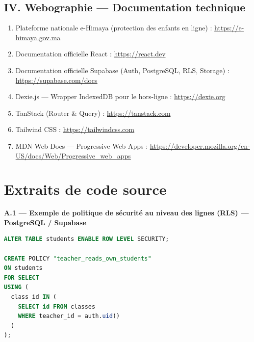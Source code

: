 \documentclass[12pt, a4paper, oneside]{report}
\begin{document}
\section*{IV. Webographie — Documentation technique}
\begin{enumerate}[leftmargin=*]
  \item Plateforme nationale e-Himaya (protection des enfants en ligne) : \url{https://e-himaya.gov.ma}

  \item Documentation officielle React : \url{https://react.dev}

  \item Documentation officielle Supabase (Auth, PostgreSQL, RLS, Storage) : \url{https://supabase.com/docs}

  \item Dexie.js — Wrapper IndexedDB pour le hors-ligne : \url{https://dexie.org}

  \item TanStack (Router \& Query) : \url{https://tanstack.com}

  \item Tailwind CSS : \url{https://tailwindcss.com}

  \item MDN Web Docs — Progressive Web Apps : \url{https://developer.mozilla.org/en-US/docs/Web/Progressive_web_apps}
\end{enumerate}

\renewcommand{\chaptername}{Annexe}
\appendix
{}

\chapter{Extraits de code source}
\label{ann:code}

\textbf{A.1 — Exemple de politique de sécurité au niveau des lignes (RLS) — PostgreSQL / Supabase}
\begin{lstlisting}[language=SQL, caption={Politique RLS : un enseignant n'accède qu'aux élèves de ses classes}]
ALTER TABLE students ENABLE ROW LEVEL SECURITY;

CREATE POLICY "teacher_reads_own_students"
ON students
FOR SELECT
USING (
  class_id IN (
    SELECT id FROM classes
    WHERE teacher_id = auth.uid()
  )
);
\end{lstlisting}
\end{document}
